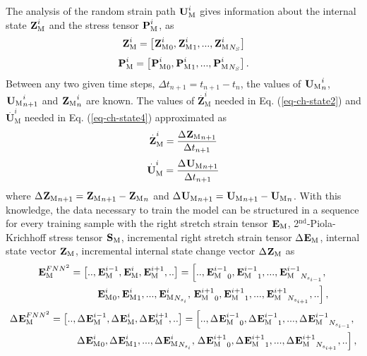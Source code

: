 The analysis of the random strain path $ \tgm[]{U}^i $ gives information about the internal state $ \tgm[]{Z}^i $ and the stress tensor $ \tgm[]{P}^i $, as 
\begin{equation}\label{eq-nn-data7}
\tgm[]{Z}^i=\left[{\tgm[]{Z}^i}_0,{\tgm[]{Z}^i}_1,...,{\tgm[]{Z}^i}_{N_S}\right]
\end{equation}
\begin{equation}\label{eq-nn-data8}
\tgm[]{P}^i=\left[{\tgm[]{P}^i}_0,{\tgm[]{P}^i}_1,...,{\tgm[]{P}^i}_{N_S}\right].
\end{equation}
Between any two given time steps, $  \Delta t_{n+1}=t_{n+1}-t_n  $, the values of $ {\tgm[]{U}}_n^i $, $ {\tgm[]{U}}_{n+1}^i $ and $ {\tgm[]{Z}}_n^i $ are known. The values of $ \overset{.}{\textbf{Z}}_\text{M}^i $ needed in Eq. (\ref{eq-ch-state2}) and $ \overset{.}{\textbf{U}}_\text{M}^i $ needed in Eq. (\ref{eq-ch-state4}) approximated as 
\begin{equation}\label{eq-nn-data9}
\overset{.}{\textbf{Z}}_\text{M}^i=\frac{{\Delta\tgm[]{Z}}_{n+1}}{\Delta t_{n+1}}
\end{equation}
\begin{equation}\label{eq-nn-data10}
\overset{.}{\textbf{U}}_\text{M}^i=\frac{{\Delta\tgm[]{U}}_{n+1}}{\Delta t_{n+1}}
\end{equation}
where $ {\Delta\tgm[]{Z}}_{n+1}={\tgm[]{Z}}_{n+1}-{\tgm[]{Z}}_{n} $ and $ {\Delta\tgm[]{U}}_{n+1}={\tgm[]{U}}_{n+1}-{\tgm[]{U}}_{n} $. With this knowledge, the data necessary to train the \fnn model can be structured in a sequence for every training sample with the right stretch strain tensor $ \tgm[]{E} $, 2$ ^\text{nd} $-Piola-Krichhoff stress tensor $ \tgm[]{S} $, incremental right stretch strain tensor $ \Delta\tgm[]{E} $, internal state vector $ \tgm[]{Z} $, incremental internal state change vector $ \Delta\tgm[]{Z} $ as
\begin{eqnarray}\label{eq-nn-data12}
\tgm[]{E}^{FNN^2}=\left[..,\tgm[]{E}^{i-1},\tgm[]{E}^i,\tgm[]{E}^{i+1},..\right] = 
\left[..,{\tgm[]{E}^{i-1}}_0,{\tgm[]{E}^{i-1}}_1,...,{\tgm[]{E}^{i-1}}_{N_{s_{i-1}}},\right.\nonumber\\
{\tgm[]{E}^i}_0,{\tgm[]{E}^i}_1,...,{\tgm[]{E}^i}_{N_{s_i}},
\left.{\tgm[]{E}^{i+1}}_0,{\tgm[]{E}^{i+1}}_1,...,{\tgm[]{E}^{i+1}}_{N_{s_{i+1}}},..\right],
\end{eqnarray}
\begin{eqnarray}\label{eq-nn-data12-1}
\Delta\tgm[]{E}^{FNN^2}=\left[..,\Delta\tgm[]{E}^{i-1},\Delta\tgm[]{E}^i,\Delta\tgm[]{E}^{i+1},..\right] = 
\left[..,{\Delta\tgm[]{E}^{i-1}}_0,{\Delta\tgm[]{E}^{i-1}}_1,...,{\Delta\tgm[]{E}^{i-1}}_{N_{s_{i-1}}},\right.\nonumber\\
{\Delta\tgm[]{E}^i}_0,{\Delta\tgm[]{E}^i}_1,...,{\Delta\tgm[]{E}^i}_{N_{s_i}},
\left.{\Delta\tgm[]{E}^{i+1}}_0,{\Delta\tgm[]{E}^{i+1}}_1,...,{\Delta\tgm[]{E}^{i+1}}_{N_{s_{i+1}}},..\right],
\end{eqnarray}
